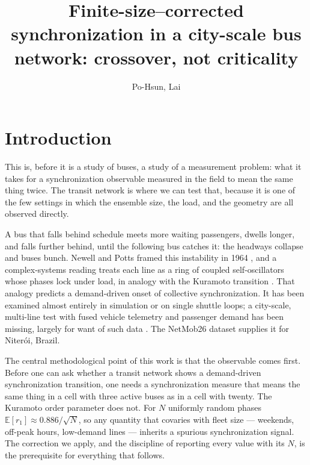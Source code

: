 \documentclass[9pt,twocolumn,twoside]{opticajnl}
\title{Finite-size--corrected synchronization in a city-scale bus network:
crossover, not criticality}
\author[1,*]{Po-Hsun, Lai}
\affil[1]{Physics, National Taiwan University, Taipei, Taiwan}
\affil[*]{b11202025@ntu.edu.tw}
\begin{document}
\maketitle

\section{Introduction}

This is, before it is a study of buses, a study of a measurement problem: what it takes for a
synchronization observable measured in the field to mean the same thing twice. The transit
network is where we can test that, because it is one of the few settings in which the ensemble
size, the load, and the geometry are all observed directly.

A bus that falls behind schedule meets more waiting passengers, dwells longer, and falls
further behind, until the following bus catches it: the headways collapse and buses bunch.
Newell and Potts framed this instability in 1964 \cite{newell64}, and a complex-systems reading
treats each line as a ring of coupled self-oscillators whose phases lock under load, in analogy
with the Kuramoto transition \cite{saw19,strogatz00,kuramoto75}. That analogy predicts a
demand-driven onset of collective synchronization. It has been examined almost entirely in
simulation or on single shuttle loops; a city-scale, multi-line test with fused vehicle
telemetry and passenger demand has been missing, largely for want of such data
\cite{schlapfer21}. The NetMob26 dataset \cite{netmob26} supplies it for Niter\'oi, Brazil.

The central methodological point of this work is that the observable comes first. Before one can
ask whether a transit network shows a demand-driven synchronization transition, one needs a
synchronization measure that means the same thing in a cell with three active buses as in a cell
with twenty. The Kuramoto order parameter does not. For $N$ uniformly random phases
$\mathbb{E}[r_1]\approx 0.886/\sqrt{N}$, so any quantity that covaries with fleet size ---
weekends, off-peak hours, low-demand lines --- inherits a spurious synchronization signal. The
correction we apply, and the discipline of reporting every value with its $N$, is the
prerequisite for everything that follows.
\end{document}
